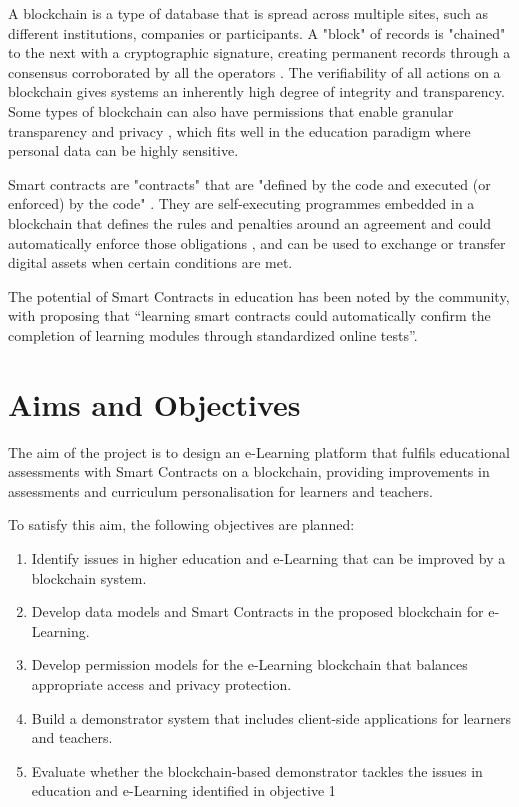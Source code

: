 A blockchain is a type of database that is spread across multiple sites, such as different institutions, companies
or participants. A "block" of records is "chained" to the next with a cryptographic signature, creating permanent records
through a consensus corroborated by all the operators \citep[p.17]{walport2016distributed}.
The verifiability of all actions on a blockchain gives systems an inherently high degree of integrity and transparency.
Some types of blockchain can also have permissions that enable granular transparency and privacy \citep[p.22]{walport2016distributed},
which fits well in the education paradigm where personal data can be highly sensitive.

Smart contracts are "contracts" that are "defined by the code and executed (or enforced) by the code" \citep[p.16]{swan2015blockchain}.
They are self-executing programmes embedded in a blockchain that defines the rules and penalties around an agreement and could automatically enforce
those obligations \citep{gulhane2017ibm}, and can be used to exchange or transfer digital assets when certain conditions are met.

The potential of Smart Contracts in education has been noted by the community, with \citet[p.62]{swan2015blockchain}
proposing that “learning smart contracts could automatically confirm the completion of learning modules through standardized
online tests”.

\section{Aims and Objectives} %

The aim of the project is to design an e-Learning platform that fulfils educational assessments
with Smart Contracts on a blockchain, providing improvements in assessments and curriculum
personalisation for learners and teachers.

To satisfy this aim, the following objectives are planned:
\begin{enumerate}
	\setlength\itemsep{0em}
	\item Identify issues in higher education and e-Learning that can be improved by a blockchain system.
	\item Develop data models and Smart Contracts in the proposed blockchain for e-Learning.
	\item Develop permission models for the e-Learning blockchain that balances appropriate access and privacy protection.
	\item Build a demonstrator system that includes client-side applications for learners and teachers.
	\item Evaluate whether the blockchain-based demonstrator tackles the issues in education and e-Learning identified in objective 1
\end{enumerate}

